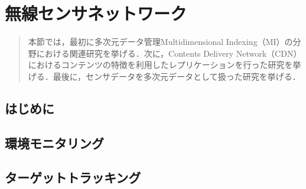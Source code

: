 \chapter{無線センサネットワーク}
\begin{large}
\begin{quote}
本節では，最初に多次元データ管理Multidimensional Indexing（MI）の分野における関連研究を挙げる．次に，Contents Delivery Network（CDN）におけるコンテンツの特徴を利用したレプリケーションを行った研究を挙げる．最後に，センサデータを多次元データとして扱った研究を挙げる．
\end{quote}
\end{large}
\clearpage

\section{はじめに}



\section{環境モニタリング}


\section{ターゲットトラッキング}


